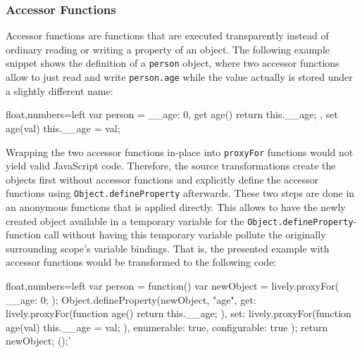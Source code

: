 \subsubsection{Accessor Functions}

Accessor functions are functions that are executed transparently instead of ordinary reading or writing a property of an object.
The following example snippet shows the definition of a \lstinline{person} object, where two accessor functions allow to just read and write \lstinline{person.age} while the value actually is stored under a slightly different name:

\begin{code}{}{float,numbers=left}
var person = {
    __age: 0,
    get age() {
        return this.__age;
    },
    set age(val) {
        this.__age = val;
    }
}
\end{code}
\iffalse
\end{verbatim}\fi

Wrapping the two accessor functions in-place into \lstinline{proxyFor} functions would not yield valid JavaScript code.
Therefore, the source transformations create the objects first without accessor functions and explicitly define the accessor functions using \lstinline{Object.defineProperty} afterwards.
These two steps are done in an anonymous functions that is applied directly.
This allows to have the newly created object available in a temporary variable for the \lstinline{Object.defineProperty}-function call without having this temporary variable pollute the originally surrounding scope's variable bindings.
That is, the presented example with accessor functions would be transformed to the following code: \\

\begin{code}{}{float,numbers=left}
var person = function() {
    var newObject = lively.proxyFor({
        __age: 0;
    });
    Object.defineProperty(newObject, "age", {
        get: lively.proxyFor(function age() {
            return this.__age;
        }),
        set: lively.proxyFor(function age(val) {
            this.__age = val;
        }),
        enumerable: true,
        configurable: true
    });
    return newObject;
}();'
\end{code}
\iffalse
\end{verbatim}\fi





